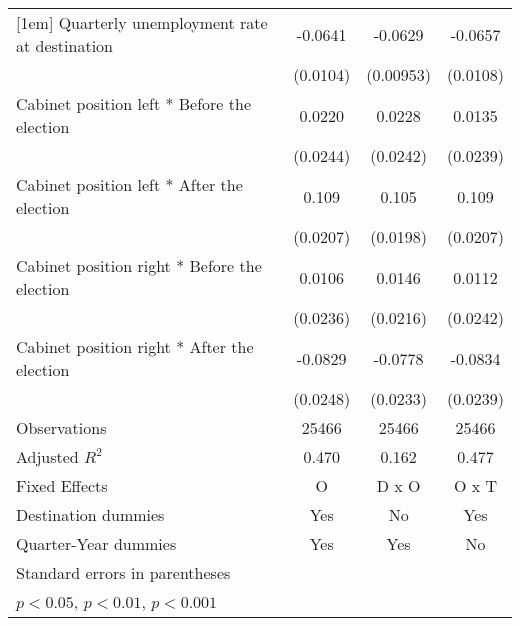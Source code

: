\begin{table}[htbp]
\begin{tabular}{l*{3}{c}}
[1em]
Quarterly unemployment rate at destination&     -0.0641\sym{***}&     -0.0629\sym{***}&     -0.0657\sym{***}\\
                    &    (0.0104)         &   (0.00953)         &    (0.0108)         \\
[1em]
Cabinet position left * Before the election&      0.0220         &      0.0228         &      0.0135         \\
                    &    (0.0244)         &    (0.0242)         &    (0.0239)         \\
[1em]
Cabinet position left * After the election&       0.109\sym{***}&       0.105\sym{***}&       0.109\sym{***}\\
                    &    (0.0207)         &    (0.0198)         &    (0.0207)         \\
[1em]
Cabinet position right * Before the election&      0.0106         &      0.0146         &      0.0112         \\
                    &    (0.0236)         &    (0.0216)         &    (0.0242)         \\
[1em]
Cabinet position right * After the election&     -0.0829\sym{**} &     -0.0778\sym{**} &     -0.0834\sym{**} \\
                    &    (0.0248)         &    (0.0233)         &    (0.0239)         \\
\hline
Observations        &       25466         &       25466         &       25466         \\
Adjusted \(R^{2}\)  &       0.470         &       0.162         &       0.477         \\
Fixed Effects       &           O         &       D x O         &       O x T         \\
Destination dummies &         Yes         &          No         &         Yes         \\
Quarter-Year dummies&         Yes         &         Yes         &          No         \\
\hline\hline
\multicolumn{4}{l}{\footnotesize Standard errors in parentheses}\\
\multicolumn{4}{l}{\footnotesize \sym{*} \(p<0.05\), \sym{**} \(p<0.01\), \sym{***} \(p<0.001\)}\\
\end{tabular}
\end{table}
